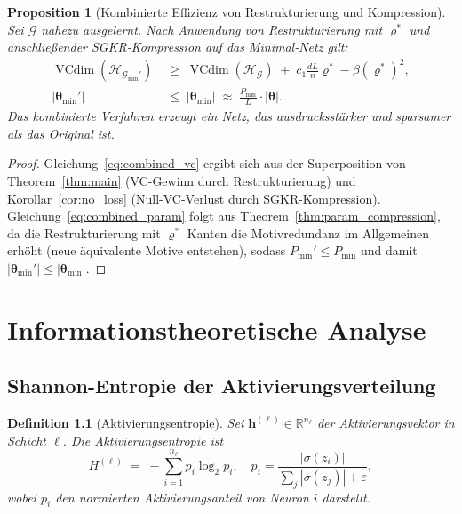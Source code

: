 \documentclass[12pt, a4paper, openany]{report}
\newtheorem{proposition}[theorem]{Proposition}
\newtheorem{definition}[theorem]{Definition}
\newcommand{\R}{\mathbb{R}}
\newcommand{\calG}{\mathcal{G}}
\newcommand{\calH}{\mathcal{H}}
\newcommand{\eps}{\varepsilon}
\DeclareMathOperator{\VC}{VCdim}
\begin{document}
\begin{proposition}[Kombinierte Effizienz von Restrukturierung und Kompression]
\label{prop:combined_efficiency}
Sei $\calG$ nahezu ausgelernt.  Nach Anwendung von Restrukturierung mit
$\varrho^*$ und anschließender SGKR-Kompression auf das Minimal-Netz gilt:
\begin{align}
  \label{eq:combined_vc}
  \VC(\calH_{\calG_{\min}'}) &\;\geq\; \VC(\calH_{\calG})
    \;+\; c_1\frac{dL}{n}\varrho^* - \beta(\varrho^*)^2, \\
  \label{eq:combined_param}
  |\bm{\theta}_{\min}'| &\;\leq\; |\bm{\theta}_{\min}|
    \;\approx\; \frac{P_{\min}}{L} \cdot |\bm{\theta}|.
\end{align}
Das kombinierte Verfahren erzeugt ein Netz, das
\emph{ausdrucksstärker} \emph{und sparsamer} als das Original ist.
\end{proposition}

\begin{proof}
Gleichung~\eqref{eq:combined_vc} ergibt sich aus der Superposition von
Theorem~\ref{thm:main} (VC-Gewinn durch Restrukturierung) und
Korollar~\ref{cor:no_loss} (Null-VC-Verlust durch SGKR-Kompression).
Gleichung~\eqref{eq:combined_param} folgt aus Theorem~\ref{thm:param_compression},
da die Restrukturierung mit $\varrho^*$ Kanten die Motivredundanz im
Allgemeinen erhöht (neue äquivalente Motive entstehen), sodass
$P_{\min}' \leq P_{\min}$ und damit $|\bm{\theta}_{\min}'| \leq |\bm{\theta}_{\min}|$.
\end{proof}

\chapter{Informationstheoretische Analyse}
\label{sec:information}

\section{Shannon-Entropie der Aktivierungsverteilung}

\begin{definition}[Aktivierungsentropie]
Sei $\bm{h}^{(\ell)} \in \R^{n_\ell}$ der Aktivierungsvektor in Schicht
$\ell$.  Die \emph{Aktivierungsentropie} ist
\[
  H^{(\ell)} \;=\; -\sum_{i=1}^{n_\ell} p_i \log_2 p_i,
  \quad p_i = \frac{|\sigma(z_i)|}{\sum_j |\sigma(z_j)| + \eps},
\]
wobei $p_i$ den normierten Aktivierungsanteil von Neuron $i$ darstellt.
\end{definition}
\end{document}

